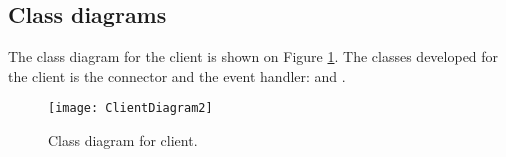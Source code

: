 \documentclass[Main]{subfiles}
\begin{document}
\subsection{Class diagrams}

The class diagram for the client is shown on Figure \ref{fig:clientuml}. 
The classes developed for the client is the connector and the event handler:   and .

\begin{figure}[hbtp]
\centering
\texttt{[image: ClientDiagram2]}
\caption{Class diagram for client.}
\label{fig:clientuml}
\end{figure}
\end{document}
